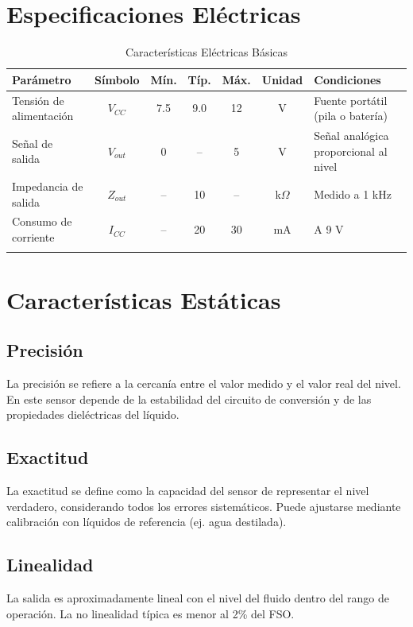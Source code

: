 \documentclass[10pt]{datasheet}
\begin{document}
\section{Especificaciones Eléctricas}
\begin{table}[h]
\begin{threeparttable}
\caption{Características Eléctricas Básicas}
\begin{tabularx}{\textwidth}{l | c | c c c | c | X}
    \thickhline
    \textbf{Parámetro} & \textbf{Símbolo} & \textbf{Mín.} & \textbf{Típ.} & \textbf{Máx.} &
    \textbf{Unidad} & \textbf{Condiciones} \\
    \hline
    Tensión de alimentación & $V_{CC}$ & 7.5 & 9.0 & 12 & V & Fuente portátil (pila o batería) \\
    Señal de salida & $V_{out}$ & 0 & – & 5 & V & Señal analógica proporcional al nivel \\
    Impedancia de salida & $Z_{out}$ & – & 10 & – & k$\Omega$ & Medido a 1 kHz \\
    Consumo de corriente & $I_{CC}$ & – & 20 & 30 & mA & A 9 V \\
    \thickhline
\end{tabularx}
\end{threeparttable}
\end{table}

\section{Características Estáticas}

\subsection{Precisión}
La precisión se refiere a la cercanía entre el valor medido y el valor real del nivel.  
En este sensor depende de la estabilidad del circuito de conversión y de las propiedades dieléctricas del líquido.  

\subsection{Exactitud}
La exactitud se define como la capacidad del sensor de representar el nivel verdadero, considerando todos los errores sistemáticos.  
Puede ajustarse mediante calibración con líquidos de referencia (ej. agua destilada).  

\subsection{Linealidad}
La salida es aproximadamente lineal con el nivel del fluido dentro del rango de operación.  
La no linealidad típica es menor al 2\% del FSO.  
\end{document}
